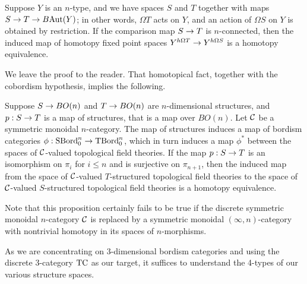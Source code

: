 \documentclass{amsart}
\begin{document}
\begin{proposition}
\label{prop:comparison-fixed-points}
Suppose $Y$ is an $n$-type, and we have spaces $S$ and $T$ together with maps $S \rightarrow T \rightarrow B\mathrm{Aut}(Y)$; in other words, $\Omega T$ acts on $Y$, and an action of $\Omega S$ on $Y$ is obtained by restriction. If the comparison map $S \rightarrow T$ is $n$-connected, then the induced map of homotopy fixed point spaces $Y^{h \Omega T} \rightarrow Y^{h \Omega S}$ is a homotopy equivalence.
\end{proposition}



\nid We leave the proof to the reader. That homotopical fact, together with the cobordism hypothesis, implies the following.

\begin{corollary} 
\label{prop-fixedpointntypes}
Suppose $S \rightarrow BO(n)$ and $T \rightarrow BO(n)$ are $n$-dimensional structures, and $p: S \rightarrow T$ is a map of structures, that is a map over $BO(n)$.  Let $\mathcal C$ be a symmetric monoidal $n$-category.  The map of structures induces a map of bordism categories $\phi: \mathrm{SBord}_0^n \rightarrow \mathrm{TBord}_0^n$, which in turn induces a map $\phi^*$ between the spaces of $\mathcal C$-valued topological field theories.  If the map $p: S \rightarrow T$ is an isomorphism on $\pi_i$ for $i \leq n$ and is surjective on $\pi_{n+1}$, then the induced map from the space of $\mathcal C$-valued $T$-structured topological field theories to the space of $\mathcal C$-valued $S$-structured topological field theories is a homotopy equivalence.
\end{corollary}

\nid Note that this proposition certainly fails to be true if the discrete symmetric monoidal $n$-category $\mathcal C$ is replaced by a symmetric monoidal $(\infty,n)$-category with nontrivial homotopy in its spaces of $n$-morphisms.

As we are concentrating on 3-dimensional bordism categories and using the discrete 3-category $\mathrm{TC}$ as our target, it suffices to understand the 4-types of our various structure spaces.

\end{document}
